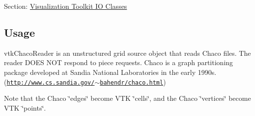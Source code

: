 Section\-: \hyperlink{sec_vtkio}{Visualization Toolkit I\-O Classes} \hypertarget{vtkwidgets_vtkxyplotwidget_Usage}{}\subsection{Usage}\label{vtkwidgets_vtkxyplotwidget_Usage}
vtk\-Chaco\-Reader is an unstructured grid source object that reads Chaco files. The reader D\-O\-E\-S N\-O\-T respond to piece requests. Chaco is a graph partitioning package developed at Sandia National Laboratories in the early 1990s. (\href{http://www.cs.sandia.gov/~bahendr/chaco.html}{\tt http\-://www.\-cs.\-sandia.\-gov/$\sim$bahendr/chaco.\-html})

Note that the Chaco \char`\"{}edges\char`\"{} become V\-T\-K \char`\"{}cells\char`\"{}, and the Chaco \char`\"{}vertices\char`\"{} become V\-T\-K \char`\"{}points\char`\"{}.

